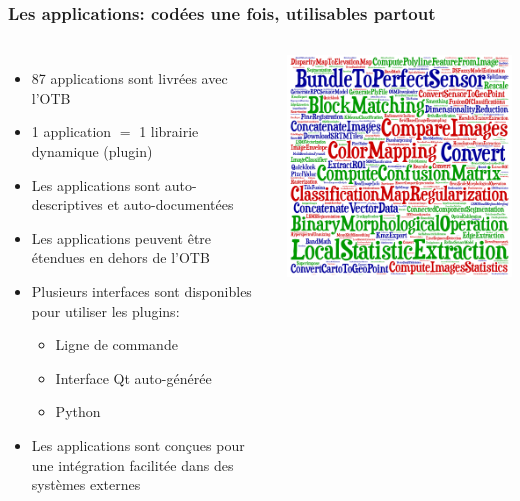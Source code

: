\documentclass[8pt]{beamer}
\begin{document}
\begin{frame}
\frametitle{Les applications: codées une fois, utilisables partout}
\begin{columns}
\begin{itemize}
\item 87 applications sont livrées avec l'OTB
\item 1 application $=$ 1 librairie dynamique (plugin)
\item Les applications sont auto-descriptives et auto-documentées
\item Les applications peuvent être étendues en dehors de l'OTB
\item Plusieurs interfaces sont disponibles pour utiliser les plugins:
\begin{itemize}
  \item Ligne de commande
  \item Interface Qt auto-générée
  \item Python
\end{itemize}
\item Les applications sont conçues pour une intégration facilitée dans des systèmes externes
\end{itemize}
\includegraphics[width=\textwidth]{images/cloud_applications.png}
\end{columns}
\end{frame}
\end{document}
